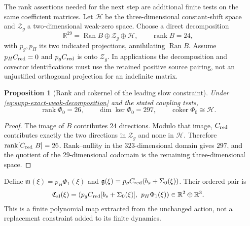 \documentclass[11pt]{article}
\numberwithin{equation}{section}
\newtheorem{proposition}[proposition]{Proposition}
\theoremstyle{definition}
\theoremstyle{remark}
\newcommand{\rank}{\operatorname{rank}}
\newcommand{\Ran}{\operatorname{Ran}}
\begin{document}
The rank assertions needed for the next step are additional finite tests
on the same coefficient matrices. Let $\mathcal H$ be the three-dimensional
constant-shift space and $\mathcal Z_g$ a two-dimensional weak-zero space.
Choose a direct decomposition
\begin{equation}
 \mathbb R^{29}=\Ran B\oplus\mathcal Z_g\oplus\mathcal H,
 \qquad \rank B=24,
 \label{eq:supp-exact-weak-decomposition}
\end{equation}
with $p_g,p_H$ its two indicated projections, annihilating $\Ran B$.
Assume $p_HC_{\rm red}=0$ and $p_gC_{\rm red}$ is onto
$\mathcal Z_g$. In applications the decomposition and covector
identifications must use the retained positive source pairing, not an
unjustified orthogonal projection for an indefinite matrix.

\begin{proposition}[Rank and cokernel of the leading slow constraint]
\label{prop:supp-exact-slow-rank}
Under \eqref{eq:supp-exact-weak-decomposition} and the stated coupling
tests,
\begin{equation}
 \rank\Phi_0=26,\qquad \dim\ker\Phi_0=297,\qquad
 \operatorname{coker}\Phi_0\cong\mathcal H.
 \label{eq:supp-exact-critical-dimensions}
\end{equation}
\end{proposition}
\begin{proof}
The image of $B$ contributes $24$ directions. Modulo that image,
$C_{\rm red}$ contributes exactly the two directions in $\mathcal Z_g$
and none in $\mathcal H$. Therefore $\rank[C_{\rm red}\ B]=26$.
Rank--nullity in the $323$-dimensional domain gives $297$, and the quotient
of the $29$-dimensional codomain is the remaining three-dimensional space.
\end{proof}

Define $\mathfrak m(\xi)=p_H\Phi_1(\xi)$ and
$\mathfrak g(\xi)=p_gC_{\rm red}(b_s+\Sigma_0(\xi))$.
Their ordered pair is
\begin{equation}
 \mathfrak C_{\rm sl}(\xi)=
 \left(p_gC_{\rm red}[b_s+\Sigma_0(\xi)],\ p_H\Phi_1(\xi)\right)
 \in\mathbb R^2\oplus\mathbb R^3.
 \label{eq:main-exact-five-map}
\end{equation} This is a finite
polynomial map extracted from the unchanged action, not a replacement
constraint added to its finite dynamics.
\end{document}
